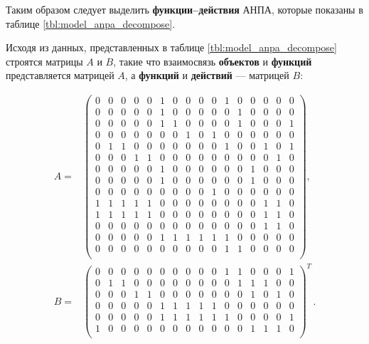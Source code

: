 Таким образом следует выделить \textbf{функции--действия} АНПА, которые показаны в таблице
\ref{tbl:model_anpa_decompose}.


Исходя из данных, представленных в таблице \ref{tbl:model_anpa_decompose}
строятся матрицы $A$ и $B$, такие что
взаимосвязь \textbf{объектов} и \textbf{функций} представляется матрицей $A$,
а \textbf{функций} и \textbf{действий} --- матрицей $B$:

\begin{equation}\label{eq:matrix_ab}
    \begin{split}
    A = &\begin{pmatrix}
        0 & 0 & 0 & 0 & 0 & 1 & 0 & 0 & 0 & 0 & 1 & 0 & 0 & 0 & 0 & 0 \\
        0 & 0 & 0 & 0 & 0 & 1 & 0 & 0 & 0 & 0 & 0 & 1 & 0 & 0 & 0 & 0 \\
        0 & 0 & 0 & 0 & 0 & 1 & 1 & 0 & 0 & 0 & 0 & 1 & 0 & 0 & 0 & 1 \\
        0 & 0 & 0 & 0 & 0 & 0 & 0 & 1 & 0 & 1 & 0 & 0 & 0 & 0 & 0 & 0 \\
        0 & 1 & 1 & 0 & 0 & 0 & 0 & 0 & 0 & 0 & 1 & 0 & 0 & 1 & 0 & 1 \\
        0 & 0 & 0 & 1 & 1 & 0 & 0 & 0 & 0 & 0 & 0 & 0 & 0 & 0 & 1 & 0 \\
        0 & 0 & 0 & 0 & 0 & 1 & 0 & 0 & 0 & 0 & 0 & 0 & 1 & 0 & 0 & 0 \\
        0 & 0 & 0 & 0 & 0 & 1 & 0 & 0 & 0 & 0 & 0 & 0 & 1 & 0 & 0 & 0 \\
        0 & 0 & 0 & 0 & 0 & 0 & 0 & 0 & 0 & 1 & 0 & 0 & 0 & 0 & 0 & 0 \\
        1 & 1 & 1 & 1 & 1 & 0 & 0 & 0 & 0 & 0 & 0 & 0 & 0 & 1 & 1 & 0 \\
        1 & 1 & 1 & 1 & 1 & 0 & 0 & 0 & 0 & 0 & 0 & 0 & 0 & 1 & 1 & 0 \\
        0 & 0 & 0 & 0 & 0 & 0 & 0 & 0 & 0 & 0 & 0 & 0 & 0 & 1 & 1 & 0 \\
        0 & 0 & 0 & 0 & 0 & 1 & 1 & 1 & 1 & 1 & 1 & 0 & 0 & 0 & 0 & 0 \\
        0 & 0 & 0 & 0 & 0 & 0 & 0 & 0 & 0 & 0 & 1 & 1 & 0 & 0 & 0 & 0 \\
    \end{pmatrix},{}\\
%
    B = &\begin{pmatrix}
        0 & 0 & 0 & 0 & 0 & 0 & 0 & 0 & 0 & 0 & 1 & 1 & 0 & 0 & 0 & 1 \\
        0 & 1 & 1 & 0 & 0 & 0 & 0 & 0 & 0 & 0 & 0 & 1 & 1 & 1 & 0 & 0 \\
        0 & 0 & 0 & 1 & 1 & 0 & 0 & 0 & 0 & 0 & 0 & 0 & 1 & 0 & 1 & 0 \\
        0 & 0 & 0 & 0 & 0 & 1 & 1 & 1 & 1 & 1 & 0 & 0 & 0 & 0 & 0 & 0 \\
        0 & 0 & 0 & 0 & 0 & 1 & 1 & 1 & 1 & 1 & 1 & 0 & 0 & 0 & 0 & 1 \\
        1 & 0 & 0 & 0 & 0 & 0 & 0 & 0 & 0 & 0 & 0 & 0 & 1 & 1 & 1 & 0 \\
    \end{pmatrix}^T\,.
\end{split}
\end{equation}

